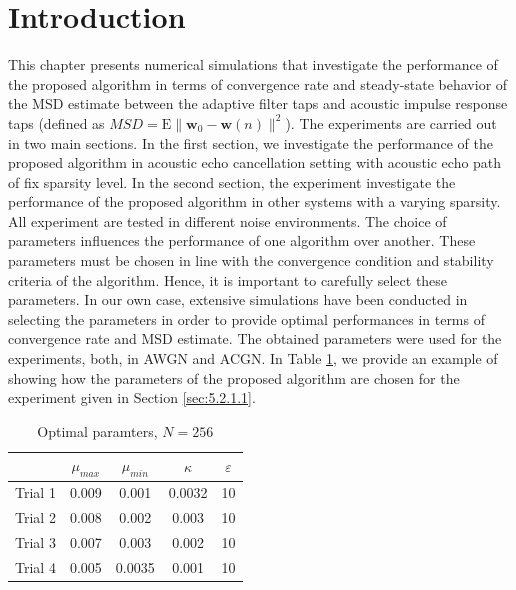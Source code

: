 

\section{Introduction}\label{sec:5.1}
\vspace{-0.5cm}
\noindent This chapter presents numerical simulations that investigate the performance of the proposed algorithm in terms of convergence rate and steady-state behavior of the MSD estimate between the adaptive filter taps and acoustic impulse response taps (defined as $MSD=\mathrm{E}\|\textbf{w}_0-\textbf{w}(n)\|^{2}$). The experiments are carried out in two main sections. In the first section, we investigate the performance of the proposed algorithm in acoustic echo cancellation setting with acoustic echo path of fix sparsity level. In the second section, the experiment investigate the performance of the proposed algorithm in other systems with a varying sparsity. All experiment are tested in different noise environments. The choice of parameters influences the performance of one algorithm over another. These parameters must be chosen in line with the convergence condition and stability criteria of the algorithm. Hence, it is important to carefully select these parameters. In our own case, extensive simulations have been conducted in selecting the parameters in order to provide optimal performances in terms of convergence rate and MSD estimate. The obtained parameters were used for the experiments, both, in AWGN and ACGN. In Table \ref{tablea}, we  provide an example of showing how the parameters of the proposed algorithm are chosen for the experiment given in Section \ref{sec:5.2.1.1}.

 \begin{table}[!htb]
\centering
\caption{Optimal paramters, $N=256$}
\vspace{0.5cm}
\begin{tabular}{|c|c|c|c|c|}
 \hline
   & $\mu_{max}$ &$\mu_{min}$ & $\kappa$  & $\varepsilon$ \\ \hline
 Trial 1 & 0.009 & 0.001 & 0.0032 & 10 \\ \hline
  Trial 2 & 0.008 &0.002 & 0.003 & 10  \\ \hline
 Trial 3 & 0.007 & 0.003 & 0.002 & 10   \\ \hline
 Trial 4 &  0.005 & 0.0035 & 0.001 & 10 \\ \hline
  \end{tabular}
  \label{tablea}
  \end{table}

